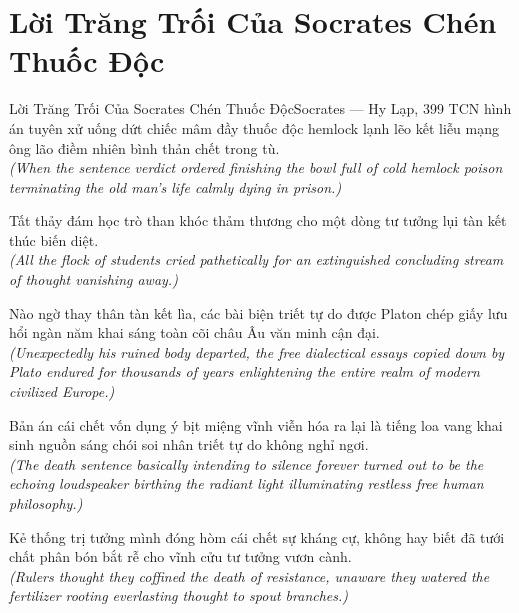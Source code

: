 \section{Lời Trăng Trối Của Socrates Chén Thuốc Độc}
\begin{truyen}{Lời Trăng Trối Của Socrates Chén Thuốc Độc}{Socrates --- Hy Lạp, 399 TCN}
 hình án tuyên xử uống dứt chiếc mâm đầy thuốc độc hemlock lạnh lẽo kết liễu mạng ông lão điềm nhiên bình thản chết trong tù.\\[4pt]
\textit{(When the sentence verdict ordered finishing the bowl full of cold hemlock poison terminating the old man's life calmly dying in prison.)}

Tất thảy đám học trò than khóc thảm thương cho một dòng tư tưởng lụi tàn kết thúc biến diệt.\\[4pt]
\textit{(All the flock of students cried pathetically for an extinguished concluding stream of thought vanishing away.)}

Nào ngờ thay thân tàn kết lìa, các bài biện triết tự do được Platon chép giấy lưu hổi ngàn năm khai sáng toàn cõi châu Âu văn minh cận đại.\\[4pt]
\textit{(Unexpectedly his ruined body departed, the free dialectical essays copied down by Plato endured for thousands of years enlightening the entire realm of modern civilized Europe.)}

Bản án cái chết vốn dụng ý bịt miệng vĩnh viễn hóa ra lại là tiếng loa vang khai sinh nguồn sáng chói soi nhân triết tự do không nghỉ ngơi.\\[4pt]
\textit{(The death sentence basically intending to silence forever turned out to be the echoing loudspeaker birthing the radiant light illuminating restless free human philosophy.)}

\end{truyen}
\begin{baihoc}
  Kẻ thống trị tưởng mình đóng hòm cái chết sự kháng cự, không hay biết đã tưới chất phân bón bắt rễ cho vĩnh cửu tư tưởng vươn cành.\\[4pt]
  \textit{(Rulers thought they coffined the death of resistance, unaware they watered the fertilizer rooting everlasting thought to spout branches.)}
\end{baihoc}


